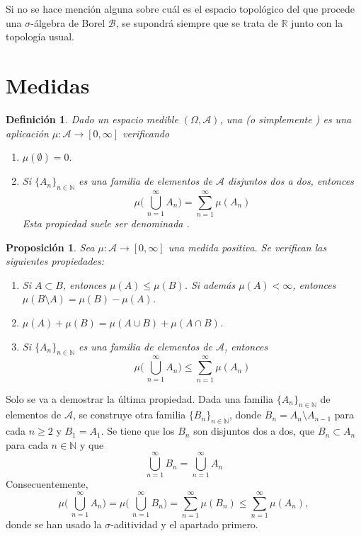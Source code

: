 \documentclass[11pt]{report}
\makeatletter
\renewenvironment{proof}[1][\proofname]{\par
  \pushQED{\qed}%
  \normalfont \topsep\z@skip %
  \trivlist
  \item[\hskip\labelsep
        \itshape
    #1\@addpunct{.}]\ignorespaces
}{%
  \popQED\endtrivlist\@endpefalse
}
\theoremstyle{mytheorem}
\newtheorem{proposition}{Proposición}
\theoremstyle{mydefinition}
\newtheorem{definition}{Definición}
\theoremstyle{myexample}
\let\oldproofname=\proofname
\renewcommand{\proofname}{\rm\bf{\oldproofname}}}
\newenvironment{cdefinition} %
  {\begin{mdframed}[
        linewidth=3pt,
        linecolor=c1,
        bottomline=false,
        topline=false,
        rightline=false,
        innerrightmargin=0pt,
        innertopmargin=0pt,
        innerbottommargin=0pt,
        innerleftmargin=1em,
        skipabove=\baselineskip]
    \begin{definition}}
  {\end{definition}\end{mdframed}}
\newenvironment{cproposition} %
  {\begin{mdframed}[
        linewidth=3pt,
        linecolor=c2,
        bottomline=false,
        topline=false,
        rightline=false,
        innerrightmargin=0pt,
        innertopmargin=0pt,
        innerbottommargin=0pt,
        innerleftmargin=1em,
        skipabove=\baselineskip]
    \begin{proposition}}
  {\end{proposition}\end{mdframed}}
\newcommand{\R}{\mathbb R}
\newcommand{\N}{\mathbb N}
\newcommand{\mybf}[1]{\boldmath\textbf{\color{c1}#1}\unboldmath} %
\makeatother
\begin{document}
Si no se hace mención alguna sobre cuál es el espacio topológico del que procede una $\sigma$-álgebra de Borel $\mathcal{B}$, se supondrá siempre que se trata de $\R$ junto con la topología usual.

\section{Medidas}

\begin{cdefinition}
Dado un espacio medible $(\Omega, \mathcal{A})$, una \mybf{{medida positiva}} (o simplemente \mybf{{medida}}) es una aplicación $\mu \colon \mathcal{A} \to [0,\infty]$ verificando
\begin{enumerate}
    \item $\mu(\emptyset) = 0.$
    \item Si $\{A_n\}_{n \in \N}$ es una familia de elementos de $\mathcal{A}$ disjuntos dos a dos, entonces
    \[\mu\biggl( \, \bigcup_{n=1}^\infty A_n\biggr) = \sum_{n=1}^\infty \mu(A_n)\]
    Esta propiedad suele ser denominada \mybf{{$\bm{\sigma}$-aditividad}}.
\end{enumerate}
\end{cdefinition}

\begin{cproposition}
\label{prop1.1.}
Sea $\mu \colon \mathcal{A} \to [0,\infty]$ una medida positiva. Se verifican las siguientes propiedades:
\begin{enumerate}
    \item Si $A \subset B$, entonces $\mu(A) \leq \mu(B)$. Si además $\mu(A) < \infty$, entonces $\mu(B \setminus A) = \mu(B) - \mu(A)$.
    \item $\mu(A)+\mu(B) = \mu(A \cup B) + \mu(A \cap B)$.
    \item Si $\{A_n\}_{n \in \N}$ es una familia de elementos de $\mathcal{A}$, entonces
    \[\mu \biggl(\, \bigcup_{n=1}^\infty A_n\biggr) \leq \sum_{n=1}^\infty \mu(A_n)\]
\end{enumerate}
\end{cproposition}

\begin{proof}
Solo se va a demostrar la última propiedad. Dada una familia $\{A_n\}_{n \in \N}$ de elementos de $\mathcal{A}$, se construye otra familia $\{B_n\}_{n \in \N}$, donde $B_n = A_n \setminus A_{n-1}$ para cada $n \geq 2$ y $B_1 = A_1$. Se tiene que los $B_n$ son disjuntos dos a dos, que $B_n \subset A_n$ para cada $n \in \N$ y que
\[\bigcup_{n=1}^\infty B_n = \bigcup_{n=1}^\infty A_n\]
Consecuentemente,
\[\mu\biggl(\, \bigcup_{n=1}^\infty A_n\biggr) = \mu\biggl(\, \bigcup_{n=1}^\infty B_n \biggr) = \sum_{n=1}^\infty \mu(B_n) \leq \sum_{n=1}^\infty \mu(A_n),\]
donde se han usado la $\sigma$-aditividad y el apartado primero.
\end{proof}
\end{document}
